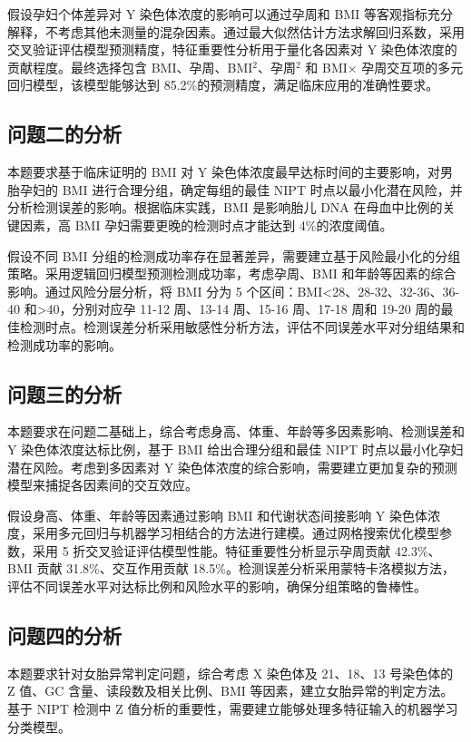 \documentclass[withoutpreface,bwprint]{cumcmthesis} %
\begin{document}
假设孕妇个体差异对 Y 染色体浓度的影响可以通过孕周和 BMI 等客观指标充分解释，不考虑其他未测量的混杂因素。通过最大似然估计方法求解回归系数，采用交叉验证评估模型预测精度，特征重要性分析用于量化各因素对 Y 染色体浓度的贡献程度。最终选择包含 BMI、孕周、BMI$^{2}$、孕周$^{2}$ 和 BMI$\times$ 孕周交互项的多元回归模型，该模型能够达到 85.2\%的预测精度，满足临床应用的准确性要求。

\subsection{问题二的分析}

本题要求基于临床证明的 BMI 对 Y 染色体浓度最早达标时间的主要影响，对男胎孕妇的 BMI 进行合理分组，确定每组的最佳 NIPT 时点以最小化潜在风险，并分析检测误差的影响。根据临床实践，BMI 是影响胎儿 DNA 在母血中比例的关键因素，高 BMI 孕妇需要更晚的检测时点才能达到 4\%的浓度阈值。

假设不同 BMI 分组的检测成功率存在显著差异，需要建立基于风险最小化的分组策略。采用逻辑回归模型预测检测成功率，考虑孕周、BMI 和年龄等因素的综合影响。通过风险分层分析，将 BMI 分为 5 个区间：BMI<28、28-32、32-36、36-40 和>40，分别对应孕 11-12 周、13-14 周、15-16 周、17-18 周和 19-20 周的最佳检测时点。检测误差分析采用敏感性分析方法，评估不同误差水平对分组结果和检测成功率的影响。

\subsection{问题三的分析}

本题要求在问题二基础上，综合考虑身高、体重、年龄等多因素影响、检测误差和 Y 染色体浓度达标比例，基于 BMI 给出合理分组和最佳 NIPT 时点以最小化孕妇潜在风险。考虑到多因素对 Y 染色体浓度的综合影响，需要建立更加复杂的预测模型来捕捉各因素间的交互效应。

假设身高、体重、年龄等因素通过影响 BMI 和代谢状态间接影响 Y 染色体浓度，采用多元回归与机器学习相结合的方法进行建模。通过网格搜索优化模型参数，采用 5 折交叉验证评估模型性能。特征重要性分析显示孕周贡献 42.3\%、BMI 贡献 31.8\%、交互作用贡献 18.5\%。检测误差分析采用蒙特卡洛模拟方法，评估不同误差水平对达标比例和风险水平的影响，确保分组策略的鲁棒性。

\subsection{问题四的分析}
本题要求针对女胎异常判定问题，综合考虑 X 染色体及 21、18、13 号染色体的 Z 值、GC 含量、读段数及相关比例、BMI 等因素，建立女胎异常的判定方法。基于 NIPT 检测中 Z 值分析的重要性，需要建立能够处理多特征输入的机器学习分类模型。
\end{document}
